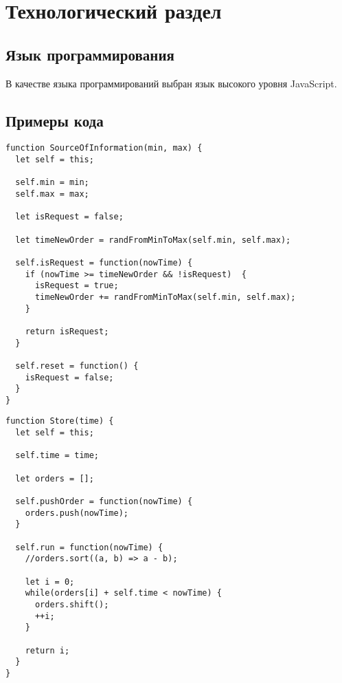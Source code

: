 \chapter{Технологический раздел}

\section{Язык программирования}
В качестве языка программирований выбран язык высокого уровня JavaScript.

\section{Примеры кода}

\begin{lstlisting}[caption={Программная модель клиента}]
function SourceOfInformation(min, max) {
  let self = this;
  
  self.min = min;
  self.max = max;

  let isRequest = false;

  let timeNewOrder = randFromMinToMax(self.min, self.max);

  self.isRequest = function(nowTime) {
    if (nowTime >= timeNewOrder && !isRequest)  {
      isRequest = true;
      timeNewOrder += randFromMinToMax(self.min, self.max);
    }

    return isRequest;
  }

  self.reset = function() {
    isRequest = false;
  }
}
\end{lstlisting}

\begin{lstlisting}[caption={Программная модель компьютера}]
function Store(time) {
  let self = this;
  
  self.time = time;

  let orders = [];

  self.pushOrder = function(nowTime) {
    orders.push(nowTime);
  }

  self.run = function(nowTime) {
    //orders.sort((a, b) => a - b);

    let i = 0;
    while(orders[i] + self.time < nowTime) {
      orders.shift();
      ++i;
    }

    return i;
  }
}
\end{lstlisting}

